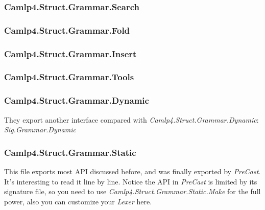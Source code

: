\subsubsection{Camlp4.Struct.Grammar.Search}
\label{Camlp4.Struct.Grammar.Search}


\subsubsection{Camlp4.Struct.Grammar.Fold}
\label{Camlp4.Struct.Grammar.Fold}

\subsubsection{Camlp4.Struct.Grammar.Insert}
\label{Camlp4.Struct.Grammar.Insert}

\subsubsection{Camlp4.Struct.Grammar.Tools}
\label{Camlp4.Struct.Grammar.Tools}


\subsubsection{Camlp4.Struct.Grammar.Dynamic}
\label{Camlp4.Struct.Grammar.Dynamic}
They export another interface compared with
\textit{Camlp4.Struct.Grammar.Dynamic}: \textit{Sig.Grammar.Dynamic}

\subsubsection{Camlp4.Struct.Grammar.Static}
\label{Camlp4.Struct.Grammar.Static}
This file exports most API discussed before, and was finally exported
by \textit{PreCast}. It's interesting to read it line by line. Notice
the API in \textit{PreCast} is limited by its signature file, so you
need to use \textit{Camlp4.Struct.Grammar.Static.Make} for the full
power, also you can customize your \textit{Lexer} here.

